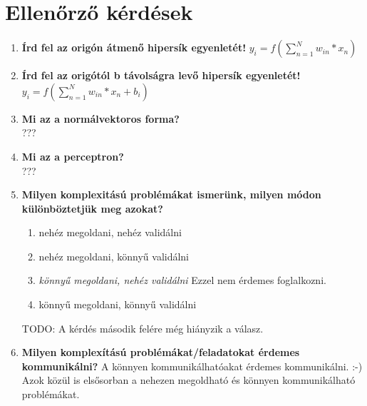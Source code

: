 \documentclass{article}
\begin{document}
\section{Ellenőrző kérdések}
\begin{enumerate}
\item{\textbf{Írd fel az origón átmenő hipersík egyenletét!}\newline
$y_i = f(\sum_{n=1}^N w_{in}*x_n)$}
\item{\textbf{Írd fel az origótól b távolságra levő hipersík egyenletét!}\newline
$y_i = f(\sum_{n=1}^N w_{in}*x_n + b_i)$}
\item{\textbf{Mi az a normálvektoros forma?}\\
???}
\item{\textbf{Mi az a perceptron?}\\
???}
\item{\textbf{Milyen komplexitású problémákat ismerünk, milyen módon különböztetjük meg azokat?}
\begin{enumerate}
\item nehéz megoldani, nehéz validálni 
\item nehéz megoldani, könnyű validálni
\item \textit{könnyű megoldani, nehéz validálni} Ezzel nem érdemes foglalkozni.
\item könnyű megoldani, könnyű validálni
\end{enumerate}

TODO: A kérdés második felére még hiányzik a válasz.
}
\item{\textbf{Milyen komplexítású problémákat/feladatokat érdemes kommunikálni?}\newline
A könnyen kommunikálhatóakat érdemes kommunikálni. :-) Azok közül is elsősorban a nehezen megoldható és könnyen kommunikálható problémákat.}
\end{enumerate}
\end{document}
